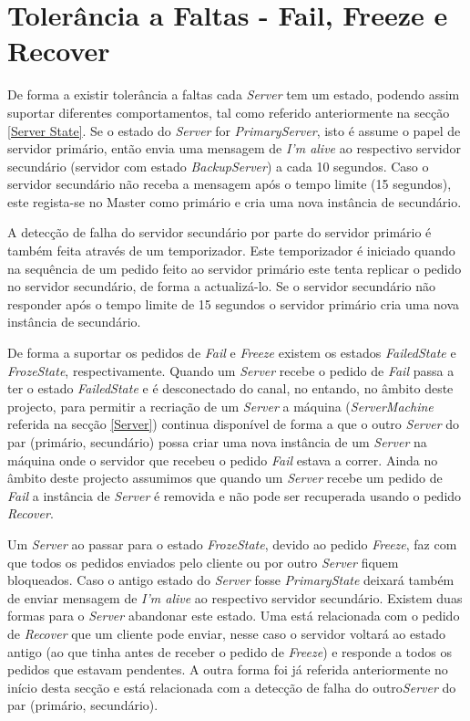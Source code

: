 \section{Tolerância a Faltas - Fail, Freeze e Recover}

De forma a existir tolerância a faltas cada \textit{Server} tem um estado, podendo assim suportar diferentes comportamentos, tal como referido anteriormente na secção \ref{Server State}. Se o estado do \textit{Server} for \textit{PrimaryServer}, isto é assume o papel de servidor primário, então envia uma mensagem de \textit{I’m alive} ao respectivo servidor secundário (servidor com estado \textit{BackupServer}) a cada 10 segundos. Caso o servidor secundário não receba a mensagem após o tempo limite (15 segundos), este regista-se no Master como primário e cria uma nova instância de secundário.

A detecção de falha do servidor secundário por parte do servidor primário é também feita através de um temporizador. Este temporizador é iniciado quando na sequência de um pedido feito ao servidor primário este tenta replicar o pedido no servidor secundário, de forma a actualizá-lo. Se o servidor secundário não responder após o tempo limite de 15 segundos o servidor primário cria uma nova instância de secundário.

De forma a suportar os pedidos de \textit{Fail} e \textit{Freeze} existem os estados \textit{FailedState} e \textit{FrozeState}, respectivamente. Quando um \textit{Server} recebe o pedido de \textit{Fail} passa a ter o estado \textit{FailedState} e é desconectado do canal, no entando, no âmbito deste projecto, para permitir a recriação de um \textit{Server} a máquina (\textit{ServerMachine} referida na secção \ref{Server}) continua disponível de forma a que o outro \textit{Server} do par (primário, secundário) possa criar uma nova instância de um \textit{Server} na máquina onde o servidor que recebeu o pedido \textit{Fail} estava a correr. Ainda no âmbito deste projecto assumimos que quando um \textit{Server} recebe um pedido de \textit{Fail} a instância de \textit{Server} é removida e não pode ser recuperada usando o pedido \textit{Recover}.

Um \textit{Server} ao passar para o estado \textit{FrozeState}, devido ao pedido \textit{Freeze}, faz com que todos os pedidos enviados pelo cliente ou por outro \textit{Server} fiquem bloqueados. Caso o antigo estado do \textit{Server} fosse \textit{PrimaryState} deixará também de enviar mensagem de \textit{I’m alive} ao respectivo servidor secundário. Existem duas formas para o \textit{Server} abandonar este estado. Uma está relacionada com o pedido de \textit{Recover} que um cliente pode enviar, nesse caso o servidor voltará ao estado antigo (ao que tinha antes de receber o pedido de \textit{Freeze}) e responde a todos os pedidos que estavam pendentes. A outra forma foi já referida anteriormente no início desta secção e está relacionada com a detecção de falha do outro\textit{Server} do par (primário, secundário).